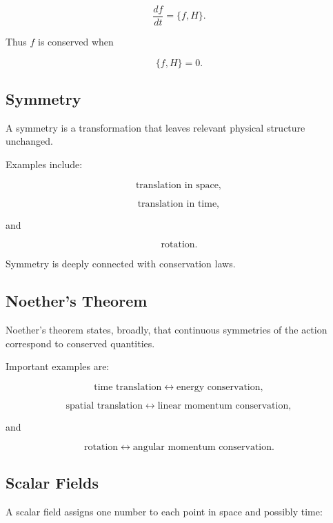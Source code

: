 \[
\boxed{
\frac{df}{dt}
=
\{f,H\}.
}
\]

Thus \(f\) is conserved when

\[
\{f,H\}=0.
\]

\subsection{Symmetry}
\label{subsec:physical-symmetry}

A symmetry is a transformation that leaves relevant physical structure
unchanged.

Examples include:

\[
\boxed{
\text{translation in space},
}
\]

\[
\boxed{
\text{translation in time},
}
\]

and

\[
\boxed{
\text{rotation}.
}
\]

Symmetry is deeply connected with conservation laws.

\subsection{Noether's Theorem}
\label{subsec:noethers-theorem}

Noether's theorem states, broadly, that continuous symmetries of the action
correspond to conserved quantities.

Important examples are:

\[
\boxed{
\text{time translation}
\longleftrightarrow
\text{energy conservation},
}
\]

\[
\boxed{
\text{spatial translation}
\longleftrightarrow
\text{linear momentum conservation},
}
\]

and

\[
\boxed{
\text{rotation}
\longleftrightarrow
\text{angular momentum conservation}.
}
\]

\subsection{Scalar Fields}
\label{subsec:physical-scalar-fields}

A scalar field assigns one number to each point in space and possibly time:

